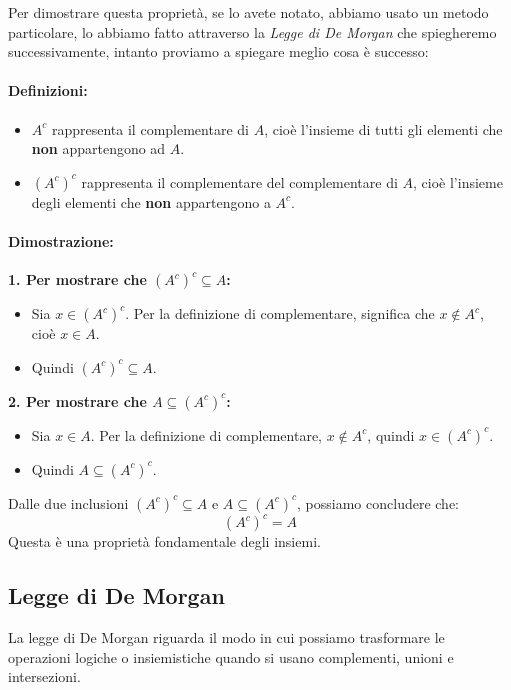 \documentclass[article,12pt]{book}
\begin{document}
\begin{enumerate}
\begin{center}
    \end{center}
Per dimostrare questa proprietà, se lo avete notato, abbiamo usato un metodo particolare, lo abbiamo fatto attraverso la \textit{Legge di De Morgan} che spiegheremo successivamente, intanto proviamo a spiegare meglio cosa è successo:

\paragraph{Definizioni:}
    \begin{itemize}
        \item $A^c$ rappresenta il complementare di $A$, cioè l'insieme di tutti gli elementi che \textbf{non} appartengono ad $A$.
        \item $(A^c)^c$ rappresenta il complementare del complementare di $A$, cioè l'insieme degli elementi che \textbf{non} appartengono a $A^c$.
 

    \end{itemize}

\paragraph{Dimostrazione:}

\textbf{1. Per mostrare che $(A^c)^c \subseteq A$:}
\begin{itemize}
    \item Sia $x \in (A^c)^c$. Per la definizione di complementare, significa che $x \notin A^c$, cioè $x \in A$.
    \item Quindi $(A^c)^c \subseteq A$.
    
\end{itemize}
\newpage 
\textbf{2. Per mostrare che $A \subseteq (A^c)^c$:}
\begin{itemize}
    \item Sia $x \in A$. Per la definizione di complementare, $x \notin A^c$, quindi $x \in (A^c)^c$.
    \item Quindi $A \subseteq (A^c)^c$.
\end{itemize}

Dalle due inclusioni $(A^c)^c \subseteq A$ e $A \subseteq (A^c)^c$, possiamo concludere che:
\[
(A^c)^c = A
\]
Questa è una proprietà fondamentale degli insiemi.

\newpage
\subsection{Legge di De Morgan}
La legge di De Morgan riguarda il modo in cui possiamo trasformare le operazioni logiche o insiemistiche quando si usano complementi, unioni e intersezioni.


\end{enumerate}
\end{document}
